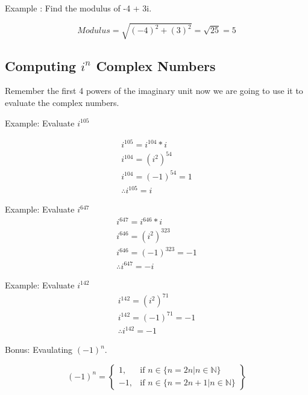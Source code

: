 Example : Find the modulus of -4 + 3i.

\begin{equation}
    Modulus = \sqrt{(-4)^2+(3)^2}=\sqrt{25}=5
\end{equation}

\subsection{Computing $i^n$ Complex Numbers}

Remember the first 4 powers of the imaginary unit now we are going to use it to evaluate the complex numbers.

Example: Evaluate $i^{105}$

\begin{equation}
    \begin{split}
        i^{105} = i^{104}*i \\
        i^{104} = (i^2)^{54} \\
        i^{104} = (-1)^{54} = 1\\
        \therefore i^{105} = i
    \end{split}
\end{equation}

Example: Evaluate $i^{647}$
\begin{equation}
    \begin{split}
        i^{647} = i^{646}*i \\
        i^{646} = (i^2)^{323} \\
        i^{646} = (-1)^{323} = -1\\
        \therefore i^{647} = -i
    \end{split}
\end{equation}

Example: Evaluate $i^{142}$
\begin{equation}
    \begin{split}
        i^{142} = (i^2)^{71} \\
        i^{142} = (-1)^{71} = -1\\        
        \therefore i^{142} = -1
    \end{split}
\end{equation}

Bonus: Evaulating $(-1)^n$.

\begin{equation}
    (-1)^n =
    \left\{
        \begin{array}{lr}
            1, & \text{if } n \in \{n=2n | n \in \mathbb{N} \} \\
            -1, & \text{if } n \in \{n=2n+1 | n \in \mathbb{N} \}
        \end{array}
    \right\} 
\end{equation}

